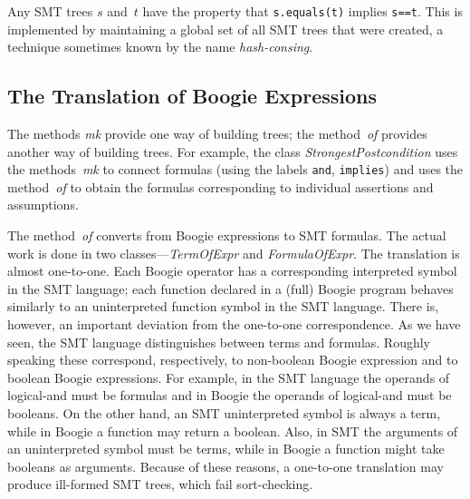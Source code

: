 \documentclass{llncs}
\newcommand{\jmlCode}{\lstinline[style=jml,basicstyle=\normalsize]}
\begin{document}
Any SMT trees $s$ and~$t$ have the property that
\jmlCode|s.equals(t)| implies \jmlCode|s==t|. This is implemented
by maintaining a global set of all SMT trees that were created, a
technique sometimes known by the name \emph{hash-consing}.

\subsection{The Translation of Boogie Expressions}

The methods \textit{mk} provide one way of building trees; the
method~\textit{of} provides another way of building trees.
For example, the class \textit{StrongestPostcondition} uses
the methods~\textit{mk} to connect formulas (using the labels
\texttt{and}, \texttt{implies}) and uses the method~\textit{of}
to obtain the formulas corresponding to individual assertions and
assumptions.

The method~\textit{of} converts from Boogie expressions
to SMT formulas. The actual work is done in two
classes---\textit{TermOfExpr} and \textit{FormulaOfExpr}. The
translation is almost one-to-one. Each Boogie operator has a
corresponding interpreted symbol in the SMT language; each
function declared in a (full) Boogie program behaves similarly
to an uninterpreted function symbol in the SMT language.
There is, however, an important deviation from the one-to-one
correspondence. As we have seen, the SMT language distinguishes
between terms and formulas. Roughly speaking these correspond,
respectively, to non-boolean Boogie expression and to boolean
Boogie expressions. For example, in the SMT language the
operands of logical-and must be formulas and in Boogie the
operands of logical-and must be booleans. On the other hand, an
SMT uninterpreted symbol is always a term, while in Boogie a
function may return a boolean. Also, in SMT the arguments of an
uninterpreted symbol must be terms, while in Boogie a function
might take booleans as arguments. Because of these reasons, a
one-to-one translation may produce ill-formed SMT trees, which
fail sort-checking.
\end{document}
